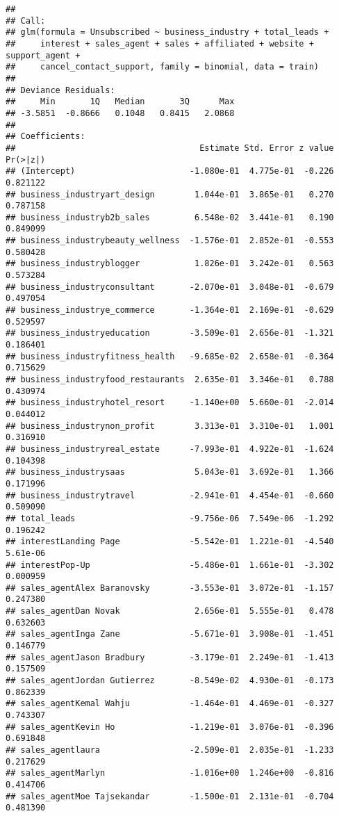 \documentclass[]{article}
\begin{document}
\begin{verbatim}
## 
## Call:
## glm(formula = Unsubscribed ~ business_industry + total_leads + 
##     interest + sales_agent + sales + affiliated + website + support_agent + 
##     cancel_contact_support, family = binomial, data = train)
## 
## Deviance Residuals: 
##     Min       1Q   Median       3Q      Max  
## -3.5851  -0.8666   0.1048   0.8415   2.0868  
## 
## Coefficients:
##                                     Estimate Std. Error z value Pr(>|z|)
## (Intercept)                       -1.080e-01  4.775e-01  -0.226 0.821122
## business_industryart_design        1.044e-01  3.865e-01   0.270 0.787158
## business_industryb2b_sales         6.548e-02  3.441e-01   0.190 0.849099
## business_industrybeauty_wellness  -1.576e-01  2.852e-01  -0.553 0.580428
## business_industryblogger           1.826e-01  3.242e-01   0.563 0.573284
## business_industryconsultant       -2.070e-01  3.048e-01  -0.679 0.497054
## business_industrye_commerce       -1.364e-01  2.169e-01  -0.629 0.529597
## business_industryeducation        -3.509e-01  2.656e-01  -1.321 0.186401
## business_industryfitness_health   -9.685e-02  2.658e-01  -0.364 0.715629
## business_industryfood_restaurants  2.635e-01  3.346e-01   0.788 0.430974
## business_industryhotel_resort     -1.140e+00  5.660e-01  -2.014 0.044012
## business_industrynon_profit        3.313e-01  3.310e-01   1.001 0.316910
## business_industryreal_estate      -7.993e-01  4.922e-01  -1.624 0.104398
## business_industrysaas              5.043e-01  3.692e-01   1.366 0.171996
## business_industrytravel           -2.941e-01  4.454e-01  -0.660 0.509090
## total_leads                       -9.756e-06  7.549e-06  -1.292 0.196242
## interestLanding Page              -5.542e-01  1.221e-01  -4.540 5.61e-06
## interestPop-Up                    -5.486e-01  1.661e-01  -3.302 0.000959
## sales_agentAlex Baranovsky        -3.553e-01  3.072e-01  -1.157 0.247380
## sales_agentDan Novak               2.656e-01  5.555e-01   0.478 0.632603
## sales_agentInga Zane              -5.671e-01  3.908e-01  -1.451 0.146779
## sales_agentJason Bradbury         -3.179e-01  2.249e-01  -1.413 0.157509
## sales_agentJordan Gutierrez       -8.549e-02  4.930e-01  -0.173 0.862339
## sales_agentKemal Wahju            -1.464e-01  4.469e-01  -0.327 0.743307
## sales_agentKevin Ho               -1.219e-01  3.076e-01  -0.396 0.691848
## sales_agentlaura                  -2.509e-01  2.035e-01  -1.233 0.217629
## sales_agentMarlyn                 -1.016e+00  1.246e+00  -0.816 0.414706
## sales_agentMoe Tajsekandar        -1.500e-01  2.131e-01  -0.704 0.481390

\end{verbatim}
\end{document}
